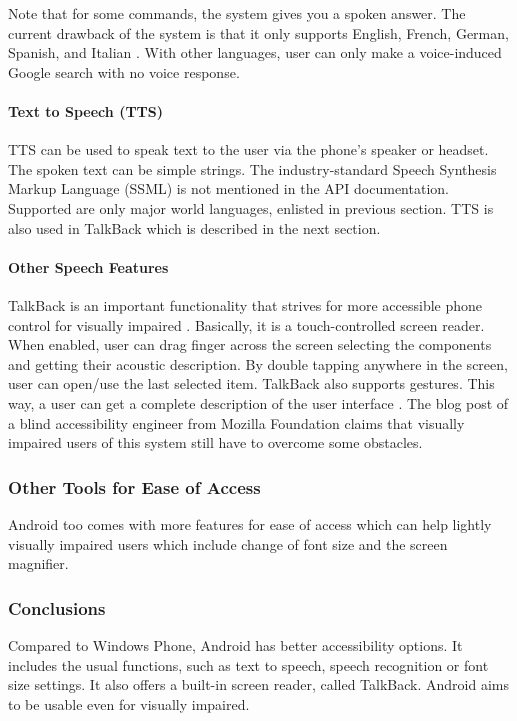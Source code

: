 Note that for some commands, the system gives you a spoken answer. The current drawback of the system is that it only supports English, French, German, Spanish, and Italian \cite{androidTTS}. With other languages, user can only make a voice-induced Google search with no voice response.

\paragraph{Text to Speech (TTS)}
TTS can be used to speak text to the user via the phone's speaker or headset. The spoken text can be simple strings. The industry-standard Speech Synthesis Markup Language (SSML) is not mentioned in the API documentation. Supported are only major world languages, enlisted in previous section. TTS is also used in TalkBack which is described in the next section.

\paragraph{Other Speech Features}
TalkBack is an important functionality that strives for more accessible phone control for visually impaired \cite{androidAccbility}. Basically, it is a touch-controlled screen reader. When enabled, user can drag finger across the screen selecting the components and getting their acoustic description. By double tapping anywhere in the screen, user can open/use the last selected item. TalkBack also supports gestures. This way, a user can get a complete description of the user interface \cite{androidAccbility}. The blog post of a blind accessibility engineer from Mozilla Foundation \cite{mozillaguy} claims that visually impaired users of this system still have to overcome some obstacles.

\subsubsection{Other Tools for Ease of Access}
Android too comes with more features for ease of access which can help lightly visually impaired users which include change of font size and the screen magnifier.

\subsubsection{Conclusions}
Compared to Windows Phone, Android has better accessibility options. It includes the usual functions, such as text to speech, speech recognition or font size settings. It also offers a built-in screen reader, called TalkBack. Android aims to be usable even for visually impaired.





